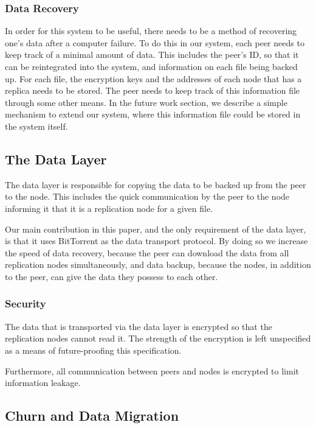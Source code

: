 \documentclass[12pt]{report}
\begin{document}
\subsubsection{Data Recovery}
\label{subsubsec:DataRecovery_sec:DataExchange_chap:BTBackup}
In order for this system to be useful, there needs to be a method of recovering one's data after a computer failure. To do this in our system, each peer needs to keep track of a minimal amount of data. This includes the peer's ID, so that it can be reintegrated into the system, and information on each file being backed up. For each file, the encryption keys and the addresses of each node that has a replica needs to be stored. The peer needs to keep track of this information file through some other means. In the future work section, we describe a simple mechanism to extend our system, where this information file could be stored in the system itself.

\subsection{The Data Layer} \label{subsec:TheDataLayer}

The data layer is responsible for copying the data to be backed up from the peer to the node. This includes the quick communication by the peer to the node informing it that it is a replication node for a given file.

Our main contribution in this paper, and the only requirement of the data layer, is that it uses BitTorrent as the data transport protocol. By doing so we increase the speed of data recovery, because the peer can download the data from all replication nodes simultaneously, and data backup, because the nodes, in addition to the peer, can give the data they possess to each other.

\subsubsection{Security}

The data that is transported via the data layer is encrypted so that the replication nodes cannot read it. The strength of the encryption is left unspecified as a means of future-proofing this specification.

Furthermore, all communication between peers and nodes is encrypted to limit information leakage.

\subsection{Churn and Data Migration} \label{sec:ChurnandDataMigration_DataExchange}
\end{document}

